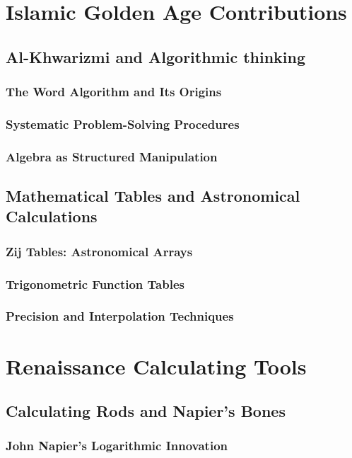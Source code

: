 \documentclass[12pt, oneside, openany]{book}
\begin{document}
\section{Islamic Golden Age Contributions}
\subsection{Al-Khwarizmi and Algorithmic thinking}
\subsubsection{The Word Algorithm and Its Origins}
\subsubsection{Systematic Problem-Solving Procedures}
\subsubsection{Algebra as Structured Manipulation}

\subsection{Mathematical Tables and Astronomical Calculations}
\subsubsection{Zij Tables: Astronomical Arrays}
\subsubsection{Trigonometric Function Tables}
\subsubsection{Precision and Interpolation Techniques}

\section{Renaissance Calculating Tools}
\subsection{Calculating Rods and Napier's Bones}
\subsubsection{John Napier's Logarithmic Innovation}
\end{document}
